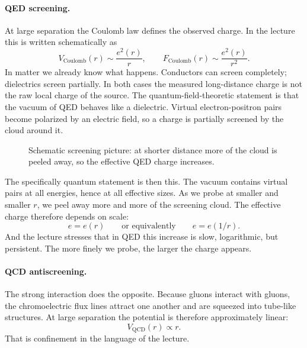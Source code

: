 \paragraph{QED screening.}
At large separation the Coulomb law defines the observed charge. In the lecture this is written schematically as
\begin{equation}
V_{\mathrm{Coulomb}}(r)\sim \frac{e^2(r)}{r},
\qquad
F_{\mathrm{Coulomb}}(r)\sim \frac{e^2(r)}{r^2}.
\end{equation}
In matter we already know what happens. Conductors can screen completely; dielectrics screen partially. In both cases the measured long-distance charge is not the raw local charge of the source. The quantum-field-theoretic statement is that the vacuum of QED behaves like a dielectric. Virtual electron-positron pairs become polarized by an electric field, so a charge is partially screened by the cloud around it.

\begin{figure}[h]
\centering
{}
\caption{Schematic screening picture: at shorter distance more of the cloud is peeled away, so the effective QED charge increases.}
\end{figure}

The specifically quantum statement is then this. The vacuum contains virtual pairs at all energies, hence at all effective sizes. As we probe at smaller and smaller \(r\), we peel away more and more of the screening cloud. The effective charge therefore depends on scale:
\begin{equation}
e=e(r)\qquad\text{or equivalently}\qquad e=e(1/r).
\end{equation}
And the lecture stresses that in QED this increase is slow, logarithmic, but persistent. The more finely we probe, the larger the charge appears.

\paragraph{QCD antiscreening.}
The strong interaction does the opposite. Because gluons interact with gluons, the chromoelectric flux lines attract one another and are squeezed into tube-like structures. At large separation the potential is therefore approximately linear:
\begin{equation}
V_{\mathrm{QCD}}(r)\propto r.
\end{equation}
That is confinement in the language of the lecture.

